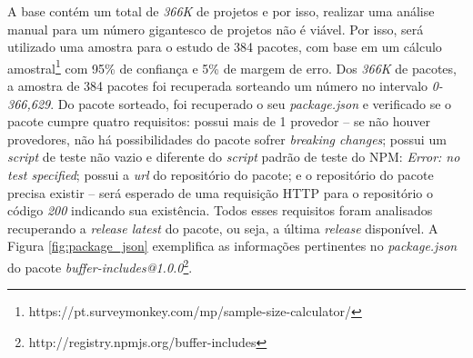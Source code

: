 \begin{table}[!h]
    \caption{Formato da base de dados para cada pacote do NPM}
    \label{tab:database}
\end{table}

A base contém um total de \textit{366K} de projetos e por isso, realizar uma análise manual para um número gigantesco de projetos não é viável. Por isso, será utilizado uma amostra para o estudo de 384 pacotes, com base em um cálculo amostral\footnote{https://pt.surveymonkey.com/mp/sample-size-calculator/} com 95\% de confiança e 5\% de margem de erro. Dos \textit{366K} de pacotes, a amostra de 384 pacotes foi recuperada sorteando um número no intervalo \textit{0-366,629}. Do pacote sorteado, foi recuperado o seu \textit{package.json} e verificado se o pacote cumpre quatro requisitos: possui mais de 1 provedor --  se não houver provedores, não há possibilidades do pacote sofrer \textit{breaking changes}; possui um \textit{script} de teste não vazio e diferente do \textit{script} padrão de teste do \gls{NPM}: \textit{Error: no test specified}; possui a \textit{url} do repositório do pacote; e o repositório do pacote precisa existir -- será esperado de uma requisição \Gls{HTTP} para o repositório o código \textit{200} indicando sua existência. Todos esses requisitos foram analisados recuperando a \textit{release latest} do pacote, ou seja, a última \textit{release} disponível. A Figura \ref{fig:package_json} exemplifica as informações pertinentes no \textit{package.json} do pacote \textit{buffer-includes@1.0.0}\footnote{http://registry.npmjs.org/buffer-includes}.

